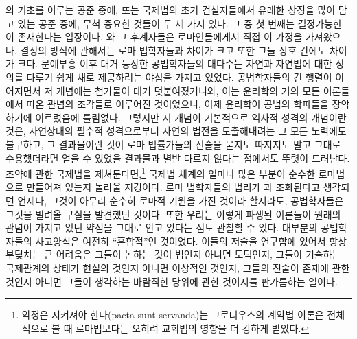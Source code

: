 의 기초를 이루는 공준 중에,
또는 국제법의 초기 건설자들에서 유래한 상징을 많이 담고 있는 공준 중에,
무척 중요한 것들이 두 세 가지 있다.
그 중 첫 번째는 결정가능한 이 존재한다는 입장이다.
와 그 후계자들은 로마인들에게서 직접 이 가정을 가져왔으나,
결정의 방식에 관해서는
로마 법학자들과 차이가 크고 또한 그들 상호 간에도 차이가 크다.
문예부흥 이후 대거 등장한 공법학자들의 대다수는
자연과 자연법에 대한 정의를 다루기 쉽게 새로 제공하려는
야심을 가지고 있었다.
공법학자들의 긴 행렬이 이어지면서 저 개념에는 첨가물이 대거 덧붙여졌거니와,
이는 윤리학의 거의 모든 이론들에서 따온 관념의 조각들로 이루어진 것이었으니,
이제 윤리학이 공법의 학파들을 장악하기에 이르렀음에 틀림없다.
그렇지만 저 개념이 기본적으로 역사적 성격의 개념이란 것은,
자연상태의 필수적 성격으로부터 자연의 법전을 도출해내려는
그 모든 노력에도 불구하고, 그 결과물이란 것이
로마 법률가들의 진술을 묻지도 따지지도 말고 그대로 수용했더라면
얻을 수 있었을 결과물과 별반 다르지 않다는 점에서도 뚜렷이 드러난다.
조약에 관한 국제법을 제쳐둔다면,\footnote{%
  약정은 지켜져야 한다(pacta sunt servanda)는
  그로티우스의 계약법 이론은 전체적으로 볼 때
  로마법보다는 오히려 교회법의 영향을 더 강하게 받았다.}
국제법 체계의 얼마나 많은 부분이 순수한 로마법으로 만들어져 있는지
놀라울 지경이다.
로마 법학자들의 법리가 과 조화된다고 생각되면
언제나,
그것이 아무리 순수히 로마적 기원을 가진 것이라 할지라도,
공법학자들은 그것을 빌려올 구실을 발견했던 것이다.
또한 우리는
이렇게 파생된 이론들이
원래의 관념이 가지고 있던 약점을
그대로 안고 있다는 점도 관찰할 수 있다.
대부분의 공법학자들의 사고양식은 여전히 ``혼합적''인 것이었다.
이들의 저술을 연구함에 있어서 항상 부딪치는 큰 어려움은
그들이 논하는 것이 법인지 아니면 도덕인지,
그들이 기술하는 국제관계의 상태가 현실의 것인지 아니면 이상적인 것인지,
그들의 진술이 존재에 관한 것인지 아니면
그들이 생각하는 바람직한 당위에 관한 것이지를 판가름하는 일이다.

